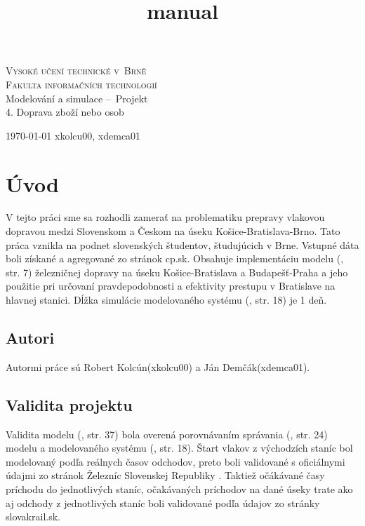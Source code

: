 \documentclass[11pt,a4paper]{article}
\title{manual}
\begin{document}
\begin{titlepage}
    \begin{center}
        \Huge
        \textsc{\Huge Vysoké učení technické v~Brně \\ {\huge Fakulta informačních technologií \\}}
        {\LARGE Modelování a simulace --\ Projekt} \\ {\Huge 4. Doprava zboží nebo osob}
    \end{center}
    {\Large \today \hfill
        xkolcu00, xdemca01}
\end{titlepage}

\tableofcontents

\newpage
\section{Úvod}
\label{sec:UVOD}

V tejto práci sme sa rozhodli zamerať na problematiku prepravy vlakovou dopravou medzi Slovenskom a Českom na úseku Košice-Bratislava-Brno.
Tato práca vznikla na podnet slovenských študentov, študujúcich v Brne.
Vstupné dáta boli získané a agregované zo stránok cp.sk\cite{odkaz:cpsk}.
Obsahuje implementáciu modelu (\cite{odkaz:simulacia}, str. 7) železničnej dopravy na úseku Košice-Bratislava a Budapešť-Praha a jeho použitie pri určovaní pravdepodobnosti a efektivity prestupu v Bratislave na hlavnej stanici.
Dĺžka simulácie modelovaného systému (\cite{odkaz:simulacia}, str. 18) je 1 deň.

\subsection{Autori}
Autormi práce sú Robert Kolcún(xkolcu00) a Ján Demčák(xdemca01).

\subsection{Validita projektu}
\label{sec:VALIDITA}

Validita modelu (\cite{odkaz:simulacia}, str. 37) bola overená porovnávaním správania (\cite{odkaz:simulacia}, str. 24) modelu a modelovaného systému (\cite{odkaz:simulacia}, str. 18).
Štart vlakov z východzích staníc bol modelovaný podľa reálnych časov odchodov, preto boli validované s oficiálnymi údajmi zo stránok Železníc Slovenskej Republiky \cite{odkaz:slovakrail}.
Taktiež očákávané časy príchodu do jednotlivých staníc, očakávaných príchodov na dané úseky trate ako aj odchody z jednotlivých staníc boli validované podľa údajov zo stránky slovakrail.sk\cite{odkaz:slovakrail}.
\end{document}
